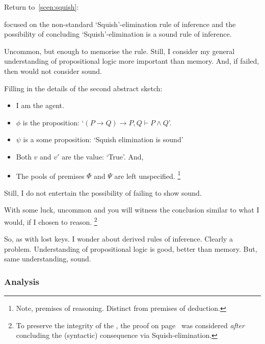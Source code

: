 \begin{note}
  Return to~\autoref{scen:squish}:

  \scenarioPLSquish*

   focused on the non-standard `Squish'-elimination rule of inference and the possibility of concluding `Squish'-elimination is a sound rule of inference.

  Uncommon, but enough to memorise the rule.
  Still, I consider my general understanding of propositional logic more important than memory.
  And, if failed, then would not consider sound.

  Filling in the details of the second abstract sketch:
  \begin{itemize}[noitemsep]
  \item
    I am the agent.
  \item
    \(\phi\) is the proposition: `\((P \rightarrow Q) \rightarrow P, Q \vdash P \land Q\)'.
  \item
    \(\psi\) is a some proposition: `Squish elimination is sound'
  \item
    Both \(v\) and \(v'\) are the value: `True'.
    And,
  \item
    The pools of premises \(\Phi\) and \(\Psi\) are left unspecified.%
    \footnote{
      Note, premises of reasoning.
      Distinct from premises of deduction.
    }
  \end{itemize}

  Still, I do not entertain the possibility of failing to show sound.

  With some luck, uncommon and you will witness the conclusion similar to what I would, if I chosen to reason.%
  \footnote{
    To preserve the integrity of the , the proof on page~\pageref{squish-elimination-proof} was considered \emph{after} concluding the (syntactic) consequence via Squish-elimination.
  }
\end{note}

\begin{note}
  So, as with lost keys.
  I wonder about derived rules of inference.
  Clearly a problem.
  Understanding of propositional logic is good, better than memory.
  But, same understanding, sound.
\end{note}

\subsubsection{Analysis}
\label{cha:zS:sec:lost-keys:analysis}

